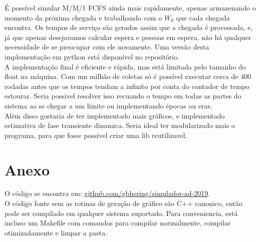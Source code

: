 \documentclass{article}
\begin{document}
É possível simular M/M/1 FCFS ainda mais rapidamente, apenas armazenando o momento da próxima chegada e trabalhando com o $W_0$ que cada chegada encontra. Os tempos de serviço são gerados assim que a chegada é processada, e, já que apenas desejavamos calcular espera e pessoas em espera, não há qualquer necessidade de se preocupar com ele novamente. Uma versão desta implementação em python está disponível no repositório. \\

A implementação final é eficiente e rápida, mas está limitada pelo tamanho do float na máquina. Com um milhão de coletas só é possível executar cerca de 400 rodadas antes que os tempos tendam a infinito por conta do contador de tempo estourar. Seria possivel resolver isso recuando o tempo em todas as partes do sistema ao se chegar a um limite ou implementando épocas ou eras. \\

Além disso gostaria de ter implementado mais gráficos, e implementado estimativa de fase transiente dinamica. Seria ideal ter modularizado mais o programa, para que fosse possivel criar uma lib reutilizavel.

\section{Anexo}

O código se encontra em: \url{github.com/gbhering/simulador-ad-2019}. \\

O código fonte sem as rotinas de geração de gráfico são C++ canonico, então pode ser compilado em qualquer sistema suportado. Para conveniencia, está incluso um Makefile com comandos para compilar normalmente, compilar otimizadamente e limpar a pasta.
\end{document}
